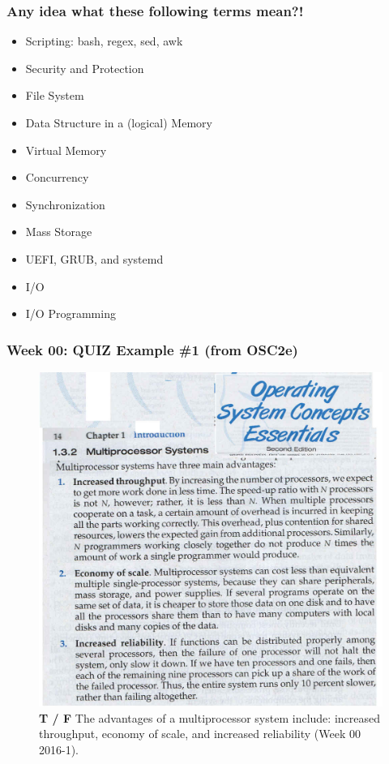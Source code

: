 \documentclass[xcolor=table, notheorems, hyperref={pdfpagelabels=false}]{beamer}
\begin{document}
\begin{frame}
\frametitle{Any idea what these following terms mean?!}
\begin{itemize}
\item Scripting: bash, regex, sed, awk
\item Security and Protection
\item File System
\item Data Structure in a (logical) Memory
\item Virtual Memory
\item Concurrency
\item Synchronization
\item Mass Storage
\item UEFI, GRUB, and systemd
\item I/O
\item I/O Programming
\end{itemize}
\end{frame}

\begin{frame}
\frametitle{Week 00: QUIZ Example \#1 (from OSC2e)}
\begin{figure}
\includegraphics[width=0.56\linewidth]{os00-osc2e}
\caption{\textbf{T / F} The advantages of a multiprocessor system include: 
increased throughput, economy of scale, and increased reliability 
(Week 00 2016-1).}
\end{figure}
\end{frame}
\end{document}
